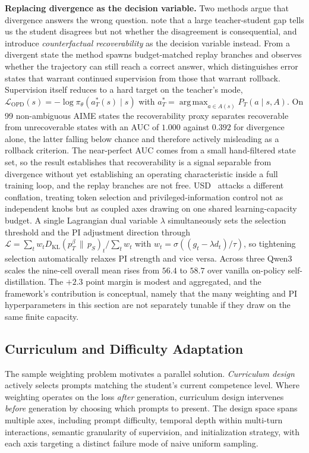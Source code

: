 \documentclass{article} %
\DeclareMathOperator*{\argmax}{arg\,max}
\begin{document}
\textbf{Replacing divergence as the decision variable.} Two methods argue that divergence answers the wrong question. \citet{2608.04408} note that a large teacher-student gap tells us the student disagrees but not whether the disagreement is consequential, and introduce \emph{counterfactual recoverability} as the decision variable instead. From a divergent state the method spawns budget-matched replay branches and observes whether the trajectory can still reach a correct answer, which distinguishes error states that warrant continued supervision from those that warrant rollback. Supervision itself reduces to a hard target on the teacher's mode, $\mathcal{L}_{\text{OPD}}(s) = -\log \pi_\theta(a^*_T(s) \mid s)$ with $a^*_T = \argmax_{a \in A(s)} P_T(a \mid s, A)$. On 99 non-ambiguous AIME states the recoverability proxy separates recoverable from unrecoverable states with an AUC of $1.000$ against $0.392$ for divergence alone, the latter falling below chance and therefore actively misleading as a rollback criterion. The near-perfect AUC comes from a small hand-filtered state set, so the result establishes that recoverability is a signal separable from divergence without yet establishing an operating characteristic inside a full training loop, and the replay branches are not free. USD~\citep{2608.08176} attacks a different conflation, treating token selection and privileged-information control not as independent knobs but as coupled axes drawing on one shared learning-capacity budget. A single Lagrangian dual variable $\lambda$ simultaneously sets the selection threshold and the PI adjustment direction through $\mathcal{L} = \sum_t w_t D_{\mathrm{KL}}(p^\beta_T \,\|\, p_S)_t / \sum_t w_t$ with $w_t = \sigma((g_t - \lambda d_t)/\tau)$, so tightening selection automatically relaxes PI strength and vice versa. Across three Qwen3 scales the nine-cell overall mean rises from $56.4$ to $58.7$ over vanilla on-policy self-distillation. The $+2.3$ point margin is modest and aggregated, and the framework's contribution is conceptual, namely that the many weighting and PI hyperparameters in this section are not separately tunable if they draw on the same finite capacity.

\subsection{Curriculum and Difficulty Adaptation}
\label{subsec:curriculum}

The sample weighting problem motivates a parallel solution. \emph{Curriculum design} actively selects prompts matching the student's current competence level. Where weighting operates on the loss \emph{after} generation, curriculum design intervenes \emph{before} generation by choosing which prompts to present. The design space spans multiple axes, including prompt difficulty, temporal depth within multi-turn interactions, semantic granularity of supervision, and initialization strategy, with each axis targeting a distinct failure mode of naive uniform sampling.
\end{document}

